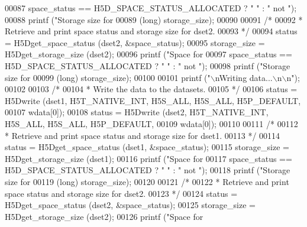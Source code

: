 \begin{DoxyCode}
{{{00087                 space\_status == H5D\_SPACE\_STATUS\_ALLOCATED ? \textcolor{stringliteral}{" "} : \textcolor{stringliteral}{" not "});
00088     printf (\textcolor{stringliteral}{"Storage size for %
00089                 (\textcolor{keywordtype}{long}) storage\_size);
00090 
00091     \textcolor{comment}{/*}
00092 \textcolor{comment}{     * Retrieve and print space status and storage size for dset2.}
00093 \textcolor{comment}{     */}
00094     status = H5Dget\_space\_status (dset2, &space\_status);
00095     storage\_size = H5Dget\_storage\_size (dset2);
00096     printf (\textcolor{stringliteral}{"Space for %
00097                 space\_status == H5D\_SPACE\_STATUS\_ALLOCATED ? \textcolor{stringliteral}{" "} : \textcolor{stringliteral}{" not "});
00098     printf (\textcolor{stringliteral}{"Storage size for %
00099                 (\textcolor{keywordtype}{long}) storage\_size);
00100 
00101     printf (\textcolor{stringliteral}{"\(\backslash\)nWriting data...\(\backslash\)n\(\backslash\)n"});
00102 
00103     \textcolor{comment}{/*}
00104 \textcolor{comment}{     * Write the data to the datasets.}
00105 \textcolor{comment}{     */}
00106     status = H5Dwrite (dset1, H5T\_NATIVE\_INT, H5S\_ALL, H5S\_ALL, H5P\_DEFAULT,
00107                 wdata[0]);
00108     status = H5Dwrite (dset2, H5T\_NATIVE\_INT, H5S\_ALL, H5S\_ALL, H5P\_DEFAULT,
00109                 wdata[0]);
00110 
00111     \textcolor{comment}{/*}
00112 \textcolor{comment}{     * Retrieve and print space status and storage size for dset1.}
00113 \textcolor{comment}{     */}
00114     status = H5Dget\_space\_status (dset1, &space\_status);
00115     storage\_size = H5Dget\_storage\_size (dset1);
00116     printf (\textcolor{stringliteral}{"Space for %
00117                 space\_status == H5D\_SPACE\_STATUS\_ALLOCATED ? \textcolor{stringliteral}{" "} : \textcolor{stringliteral}{" not "});
00118     printf (\textcolor{stringliteral}{"Storage size for %
00119                 (\textcolor{keywordtype}{long}) storage\_size);
00120 
00121     \textcolor{comment}{/*}
00122 \textcolor{comment}{     * Retrieve and print space status and storage size for dset2.}
00123 \textcolor{comment}{     */}
00124     status = H5Dget\_space\_status (dset2, &space\_status);
00125     storage\_size = H5Dget\_storage\_size (dset2);
00126     printf (\textcolor{stringliteral}{"Space for %
}}}}}}}}}
\end{DoxyCode}
